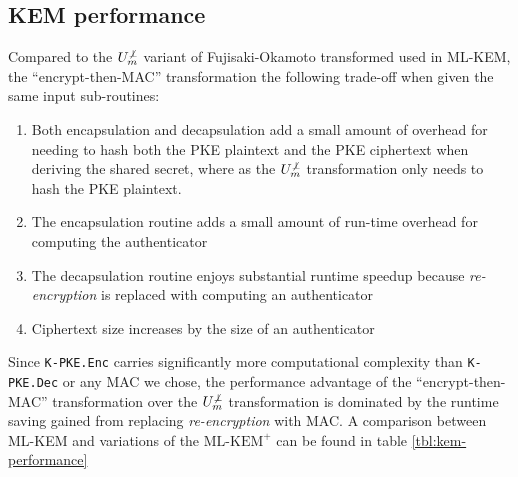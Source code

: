 \documentclass[journal=tches,submission]{iacrtrans}
\newcommand{\encrypt}{\texttt{Enc}}
\newcommand{\decrypt}{\texttt{Dec}}
\begin{document}
\subsection{KEM performance}
Compared to the $U^{\not\bot}_m$ variant of Fujisaki-Okamoto transformed used in ML-KEM, the ``encrypt-then-MAC'' transformation the following trade-off when given the same input sub-routines: \begin{enumerate}
    \item Both encapsulation and decapsulation add a small amount of overhead for needing to hash both the PKE plaintext and the PKE ciphertext when deriving the shared secret, where as the $U^{\not\bot}_m$ transformation only needs to hash the PKE plaintext.
    \item The encapsulation routine adds a small amount of run-time overhead for computing the authenticator
    \item The decapsulation routine enjoys substantial runtime speedup because \emph{re-encryption} is replaced with computing an authenticator
    \item Ciphertext size increases by the size of an authenticator
\end{enumerate}

Since \texttt{K-PKE.\encrypt} carries significantly more computational complexity than \texttt{K-PKE.\decrypt} or any MAC we chose, the performance advantage of the ``encrypt-then-MAC'' transformation over the $U^{\not\bot}_m$ transformation is dominated by the runtime saving gained from replacing \emph{re-encryption} with MAC. A comparison between ML-KEM and variations of the $\text{ML-KEM}^+$ can be found in table \ref{tbl:kem-performance}

\end{document}
